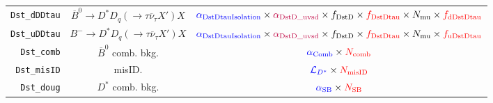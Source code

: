 \begin{landscape}
\begin{table}
\begin{tabular}{r|c|c}
  \texttt{Dst\_dDDtau} & $\overline{B}^0 \rightarrow D^* D_q (\rightarrow \tau \overline{\nu}_\tau X') X$  &                                                                             $\textcolor{blue}{\alpha_\text{DstDtauIsolation}} \times \textcolor{purple}{\alpha_\text{DstD\_uvsd}} \times f_\text{DstD} \times \textcolor{red}{f_\text{DstDtau}} \times N_\text{mu} \times \textcolor{red}{f_\text{dDstDtau}}$                                                                              \\
  \texttt{Dst\_uDDtau} &       $B^- \rightarrow D^* D_q (\rightarrow \tau \overline{\nu}_\tau X') X$       &                                                                             $\textcolor{blue}{\alpha_\text{DstDtauIsolation}} \times \textcolor{purple}{\alpha_\text{DstD\_uvsd}} \times f_\text{DstD} \times \textcolor{red}{f_\text{DstDtau}} \times N_\text{mu} \times \textcolor{red}{f_\text{uDstDtau}}$                                                                              \\
    \texttt{Dst\_comb} &                            $\overline{B}^0$ comb. bkg.                            &                                                                                                                                                        $\textcolor{blue}{\alpha_\text{Comb}} \times \textcolor{red}{N_\text{comb}}$                                                                                                                                                        \\
   \texttt{Dst\_misID} &                                      misID.                                       &                                                                                                                                                        $\textcolor{blue}{\mathcal{L}_{D^*}} \times \textcolor{red}{N_\text{misID}}$                                                                                                                                                        \\
    \texttt{Dst\_doug} &                                 $D^*$ comb. bkg.                                  &                                                                                                                                                          $\textcolor{blue}{\alpha_\text{SB}} \times \textcolor{red}{N_\text{SB}}$                                                                                                                                                          \\
\bottomrule
\end{tabular}

\end{table}
\end{landscape}


